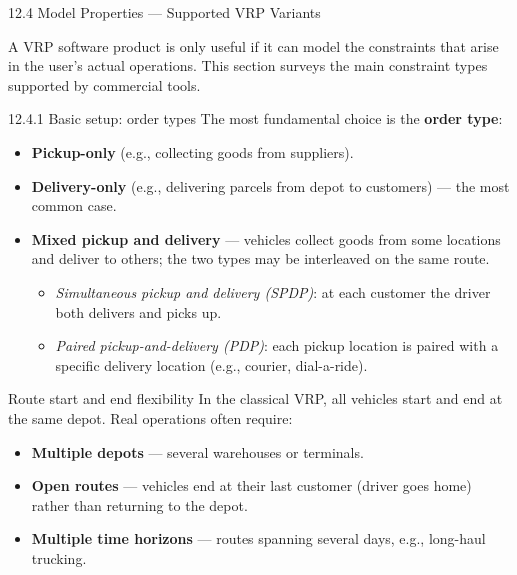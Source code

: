 \documentclass[aspectratio=169,10pt]{beamer}
\begin{document}
\begin{frame}[allowframebreaks]{12.4 \; Model Properties --- Supported VRP Variants}

  A VRP software product is only useful if it can model the constraints
  that arise in the user's actual operations.
  This section surveys the main constraint types supported by commercial tools.

  \begin{block}{12.4.1 \; Basic setup: order types}
    The most fundamental choice is the \textbf{order type}:
    \begin{itemize}
      \item \textbf{Pickup-only} (e.g., collecting goods from suppliers).
      \item \textbf{Delivery-only} (e.g., delivering parcels from depot
            to customers) --- the most common case.
      \item \textbf{Mixed pickup and delivery} --- vehicles collect goods
            from some locations and deliver to others; the two types may
            be interleaved on the same route.
        \begin{itemize}
          \item \emph{Simultaneous pickup and delivery (SPDP)}: at each
                customer the driver both delivers and picks up.
          \item \emph{Paired pickup-and-delivery (PDP)}: each pickup
                location is paired with a specific delivery location
                (e.g., courier, dial-a-ride).
        \end{itemize}
    \end{itemize}
  \end{block}

  \framebreak

  \begin{block}{Route start and end flexibility}
    In the classical VRP, all vehicles start and end at the same depot.
    Real operations often require:
    \begin{itemize}
      \item \textbf{Multiple depots} --- several warehouses or terminals.
      \item \textbf{Open routes} --- vehicles end at their last customer
            (driver goes home) rather than returning to the depot.
      \item \textbf{Multiple time horizons} ---
            routes spanning several days, e.g., long-haul trucking.
    \end{itemize}
  \end{block}


\end{frame}
\end{document}
